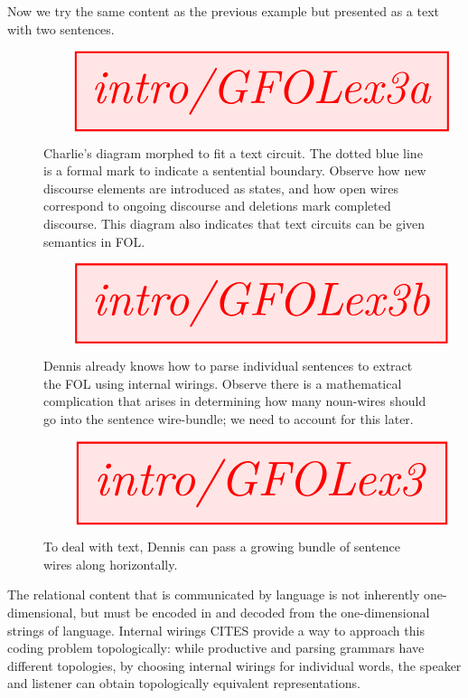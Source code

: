 \begin{example} Now we try the same content as the previous example but presented as a text with two sentences.
\begin{figure}[h!]\label{fig:GFOLex3a}
\centering
\[\resizebox{\textwidth}{!}{\tikzfig{intro/GFOLex3a}}\]
\caption{Charlie's diagram morphed to fit a text circuit. The dotted blue line is a formal mark to indicate a sentential boundary. Observe how new discourse elements are introduced as states, and how open wires correspond to ongoing discourse and deletions mark completed discourse. This diagram also indicates that text circuits can be given semantics in FOL.}
\end{figure}

\begin{figure}[h!]\label{fig:GFOLex3a}
\centering
\[\resizebox{\textwidth}{!}{\tikzfig{intro/GFOLex3b}}\]
\caption{Dennis already knows how to parse individual sentences to extract the FOL using internal wirings. Observe there is a mathematical complication that arises in determining how many noun-wires should go into the sentence wire-bundle; we need to account for this later.}
\end{figure}

\begin{figure}[h!]\label{fig:GFOLex3a}
\centering
\[\resizebox{\textwidth}{!}{\tikzfig{intro/GFOLex3}}\]
\caption{To deal with text, Dennis can pass a growing bundle of sentence wires along horizontally.}
\end{figure}
\end{example}

 The relational content that is communicated by language is not inherently one-dimensional, but must be encoded in and decoded from the one-dimensional strings of language. Internal wirings \bR CITES \e provide a way to approach this coding problem topologically: while productive and parsing grammars have different topologies, by choosing internal wirings for individual words, the speaker and listener can obtain topologically equivalent representations.


